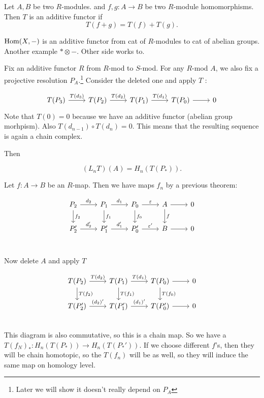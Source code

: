 \begin{definition}
    Let $A, B$ be two $R$-modules. and $f,g: A \to  B$ be two $R$-module homomorphisms.
    Then $T$ is an additive functor if
    \[
        T(f+g) = T(f) + T(g)
    .\] 
\end{definition}
\begin{eg}
    $\operatorname{Hom}(X, -)$ is an additive functor from cat of $R$-modules to cat of abelian groups.
    Another example $* \otimes -$.
    Other side works to.
\end{eg}

Fix an additive functor $R$ from $R$-mod to $S$-mod.
For any $R$-mod $A$, we also fix a projective resolution $P_A$.\footnote{Later we will show it doesn't really depend on $P_A$}
Consider the deleted one and apply $T$ :

\[
    \begin{tikzcd}
        T(P_3) \arrow[r, "T(d_3)"] & 
        T(P_2) \arrow[r, "T(d_2)"] & 
        T(P_1) \arrow[r, "T(d_1)"] & 
        T(P_0) \arrow[r, ""] & 
        0
    \end{tikzcd}
\]
Note that $T(0) = 0$ because we have an additive functor (abelian group morhpism).
Also $T(d_{n-1})  \circ  T(d_n) = 0$.
This means that the resulting sequence is again a chain complex.

Then

\begin{definition}
    \[
        (L_n T)(A) = H_n(T(P_*))
    .\] 
\end{definition}

Let $f: A \to  B$ be an $R$-map. Then we have maps $f_n$ by a previous theorem:


\[
    \begin{tikzcd}
        P_2 \arrow[r, "d_2"] \arrow[d, "f_2"]&
        P_1 \arrow[r, "d_1"] \arrow[d, "f_1"]&
        P_0 \arrow[r, "\epsilon"] \arrow[d, "f_0"]&
        A \arrow[r, ""] \arrow[d, "f"]&
        0\\
        P_2' \arrow[r, "d_2'"]  & 
        P_1' \arrow[r, "d_1'"]  & 
        P_0' \arrow[r, "\epsilon'"] &
        B \arrow[r, ""] &
        0\\
    \end{tikzcd}
\]

Now delete $A$ and apply $T$

\[
    \begin{tikzcd}
        T(P_2) \arrow[r, "T(d_2)"] \arrow[d, "T(f_2)"]&
        T(P_1) \arrow[r, "T(d_1)"] \arrow[d, "T(f_1)"]&
        T(P_0) \arrow[r, ""] \arrow[d, "T(f_0)"]&
        0\\
        T(P_2') \arrow[r, "(d_2)'"]  & 
        T(P_1') \arrow[r, "(d_1)'"]  & 
        T(P_0') \arrow[r, ""] &
        0\\
    \end{tikzcd}
\]
This diagram is also commutative, so this is a chain map.
So we have a $T(f_N)_*: H_n(T(P_*)) \to  H_n(T(P_*'))$.
If we choose different $f$'s, then they will be chain homotopic, so the $T(f_n)$ will be as well, so they will induce the same map on homology level.

